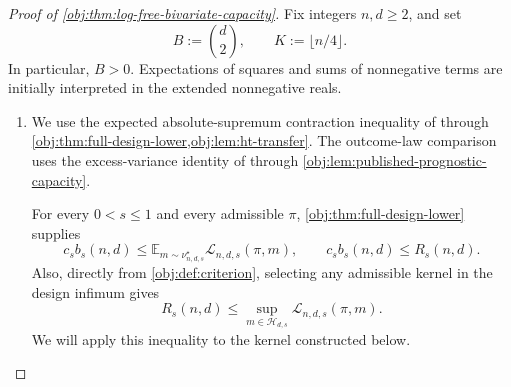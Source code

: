 \begin{proof}[Proof of \cref{obj:thm:log-free-bivariate-capacity}]
Fix integers \(n,d\geq2\), and set
\[
B:=\binom d2,\qquad K:=\lfloor n/4\rfloor.
\]
In particular, \(B>0\). Expectations of squares and sums of nonnegative terms are initially interpreted in the extended nonnegative reals.

\begin{enumerate}
\item
We use the expected absolute-supremum contraction inequality of
\citep[Theorem 12(4), with the complexity convention of Definition 2]{BartlettMendelson2002Complexities}
through \cref{obj:thm:full-design-lower,obj:lem:ht-transfer}. The outcome-law comparison uses the excess-variance identity of
\citep[Proposition 2.3, equation (2.4), under Assumption 2.1 and Definition 2.2]{Cytrynbaum2026Limits}
through \cref{obj:lem:published-prognostic-capacity}.

For every \(0<s\leq1\) and every admissible \(\pi\), \cref{obj:thm:full-design-lower} supplies
\[
c_s b_s(n,d)
\leq
\mathbb E_{m\sim\nu^\star_{n,d,s}}
\mathcal L_{n,d,s}(\pi,m),
\qquad
c_s b_s(n,d)\leq R_s(n,d).
\]
Also, directly from \cref{obj:def:criterion}, selecting any admissible kernel in the design infimum gives
\[
R_s(n,d)
\leq
\sup_{m\in\mathcal H_{d,s}}\mathcal L_{n,d,s}(\pi,m).
\]
We will apply this inequality to the kernel constructed below.


\end{enumerate}
\end{proof}

